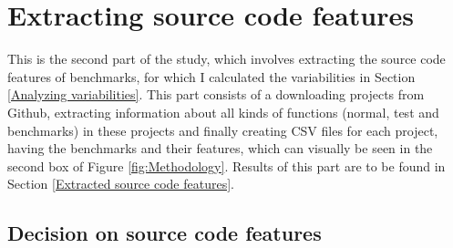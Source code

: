 \documentclass{seal_thesis}
\begin{document}
\section{Extracting source code features}

This is the second part of the study, which involves extracting the source code features of benchmarks, for which I calculated the variabilities in Section \ref{Analyzing variabilities}. This part consists of a downloading projects from Github, extracting information about all kinds of functions (normal, test and benchmarks) in these projects and finally creating CSV files for each project, having the benchmarks and their features, which can visually be seen in the second box of Figure \ref{fig:Methodology}. Results of this part are to be found in Section \ref{Extracted source code features}.

\subsection{Decision on source code features}
\end{document}

